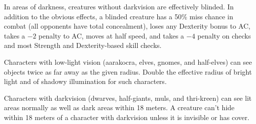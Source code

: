 In areas of darkness, creatures without darkvision are effectively blinded. In addition to the obvious effects, a blinded creature has a 50\% miss chance in combat (all opponents have total concealment), loses any Dexterity bonus to AC, takes a $-2$ penalty to AC, moves at half speed, and takes a $-4$ penalty on  checks and most Strength and Dexterity-based skill checks.

Characters with low-light vision (aarakocra, elves, gnomes, and half-elves) can see objects twice as far away as the given radius. Double the effective radius of bright light and of shadowy illumination for such characters.

Characters with darkvision (dwarves, half-giants, muls, and thri-kreen) can see lit areas normally as well as dark areas within 18 meters. A creature can't hide within 18 meters of a character with darkvision unless it is invisible or has cover.